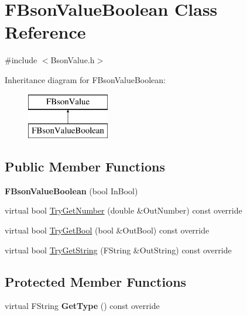 \hypertarget{class_f_bson_value_boolean}{}\section{F\+Bson\+Value\+Boolean Class Reference}
\label{class_f_bson_value_boolean}


{\ttfamily \#include $<$Bson\+Value.\+h$>$}

Inheritance diagram for F\+Bson\+Value\+Boolean\+:\begin{figure}[H]
\begin{center}
\leavevmode
\includegraphics[height=2.000000cm]{class_f_bson_value_boolean}
\end{center}
\end{figure}
\subsection*{Public Member Functions}
\begin{DoxyCompactItemize}
\item 
\mbox{\label{class_f_bson_value_boolean_a35ec849ce478e3e30520d152c582d745}} 
{\bfseries F\+Bson\+Value\+Boolean} (bool In\+Bool)
\item 
virtual bool \mbox{\hyperlink{class_f_bson_value_boolean_a7c46553a8c6caaec96ce0821977ee1e7}{Try\+Get\+Number}} (double \&Out\+Number) const override
\item 
virtual bool \mbox{\hyperlink{class_f_bson_value_boolean_a1999907437ed5dc5142f46919683c478}{Try\+Get\+Bool}} (bool \&Out\+Bool) const override
\item 
virtual bool \mbox{\hyperlink{class_f_bson_value_boolean_ace6ca5efe35c941d7b9d9f6a9df0ef02}{Try\+Get\+String}} (F\+String \&Out\+String) const override
\end{DoxyCompactItemize}
\subsection*{Protected Member Functions}
\begin{DoxyCompactItemize}
\item 
\mbox{\label{class_f_bson_value_boolean_aed853cf29de96c87ac5614a4ecd3b53b}} 
virtual F\+String {\bfseries Get\+Type} () const override
\end{DoxyCompactItemize}
